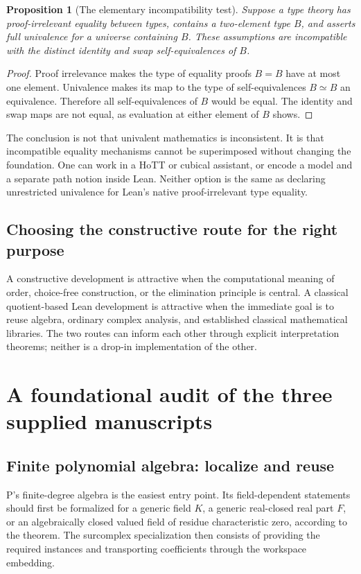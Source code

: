 \documentclass[11pt,letterpaper]{article}
\numberwithin{equation}{section}
\newtheorem{proposition}[theorem]{Proposition}
\theoremstyle{definition}
\theoremstyle{remark}
\begin{document}
\begin{proposition}[The elementary incompatibility test]\label{prop:univalence}
Suppose a type theory has proof-irrelevant equality between types, contains a two-element type $B$, and asserts full univalence for a universe containing $B$. These assumptions are incompatible with the distinct identity and swap self-equivalences of $B$.
\end{proposition}
\begin{proof}
Proof irrelevance makes the type of equality proofs $B=B$ have at most one element. Univalence makes its map to the type of self-equivalences $B\simeq B$ an equivalence. Therefore all self-equivalences of $B$ would be equal. The identity and swap maps are not equal, as evaluation at either element of $B$ shows.
\end{proof}
The conclusion is not that univalent mathematics is inconsistent. It is that incompatible equality mechanisms cannot be superimposed without changing the foundation. One can work in a HoTT or cubical assistant, or encode a model and a separate path notion inside Lean. Neither option is the same as declaring unrestricted univalence for Lean's native proof-irrelevant type equality.

\subsection{Choosing the constructive route for the right purpose}
A constructive development is attractive when the computational meaning of order, choice-free construction, or the elimination principle is central. A classical quotient-based Lean development is attractive when the immediate goal is to reuse algebra, ordinary complex analysis, and established classical mathematical libraries. The two routes can inform each other through explicit interpretation theorems; neither is a drop-in implementation of the other.

\section{A foundational audit of the three supplied manuscripts}\label{sec:manuscripts}

\subsection{Finite polynomial algebra: localize and reuse}
P's finite-degree algebra is the easiest entry point. Its field-dependent statements should first be formalized for a generic field $K$, a generic real-closed real part $F$, or an algebraically closed valued field of residue characteristic zero, according to the theorem. The surcomplex specialization then consists of providing the required instances and transporting coefficients through the workspace embedding.
\end{document}
